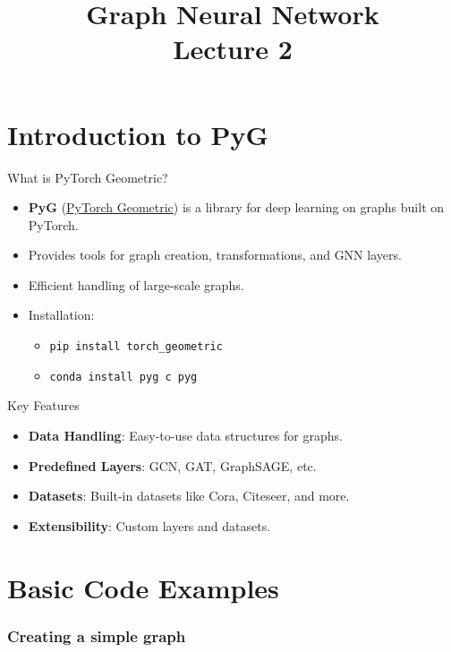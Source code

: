 \documentclass{beamer}
\title[] %
{Graph Neural Network \\Lecture 2}
\date[] %
\begin{document}
\lstset{language=Python}
\frame{\titlepage}



\section{Introduction to PyG}
\begin{frame}{What is PyTorch Geometric?}
    \begin{itemize}
        \item \textbf{PyG} (\href{https://github.com/pyg-team/pytorch_geometric}{PyTorch Geometric}) is a library for deep learning on graphs built on PyTorch.
        \item Provides tools for graph creation, transformations, and GNN layers.
        \item Efficient handling of large-scale graphs.
         \item Installation:
         	\begin{itemize}
			\item \texttt{pip install torch\_geometric}
			\item  \texttt{conda install pyg \-c pyg}
		\end{itemize}
    \end{itemize}
\end{frame}

\begin{frame}{Key Features}
    \begin{itemize}
        \item \textbf{Data Handling}: Easy-to-use data structures for graphs.
        \item \textbf{Predefined Layers}: GCN, GAT, GraphSAGE, etc.
        \item \textbf{Datasets}: Built-in datasets like Cora, Citeseer, and more.
        \item \textbf{Extensibility}: Custom layers and datasets.
    \end{itemize}
\end{frame}


\section{Basic Code Examples}
\begin{frame}
\frametitle{Creating a simple graph}

\end{frame}
\end{document}
